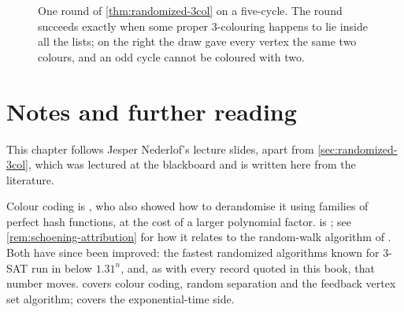 \begin{figure}[ht]
\centering
{}
\caption{One round of \cref{thm:randomized-3col} on a five-cycle. The round
succeeds exactly when some proper $3$-colouring happens to lie inside all the
lists; on the right the draw gave every vertex the same two colours, and an odd
cycle cannot be coloured with two.}
\label{fig:randomized-3col}
\end{figure}

\section{Notes and further reading}
\label{sec:randomized-further-reading}

This chapter follows Jesper Nederlof's lecture slides, apart from
\cref{sec:randomized-3col}, which was lectured at the blackboard and is written
here from the literature.

Colour coding is \citet{AlonYusterZwick1995}, who also showed how to
derandomise it using families of perfect hash functions, at the cost of a larger
polynomial factor.  is \citet{DantsinEtAl2002}; see
\cref{rem:schoening-attribution} for how it relates to the random-walk algorithm
of \citet{Schoening1999}. Both have since been improved: the fastest
randomized algorithms known for $3$-SAT run in below $1.31^n$, and, as with
every record quoted in this book, that number moves.
\citet[Chapter~5]{CyganEtAl2015} covers colour coding, random separation and the
feedback vertex set algorithm; \citet[Chapter~5]{FominKratsch2010} covers the
exponential-time side.

